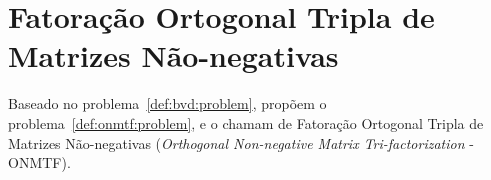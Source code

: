 \documentclass[
    12pt,                %
    oneside,            %
    a4paper,            %
    english,            %
    brazil                %
    ]{abntex2ppgsi}
\newtheorem{theorem}{Teorema}
\begin{document}




\section{Fatoração Ortogonal Tripla de Matrizes Não-negativas}
\label{sec:ONMTF}

Baseado no problema~\ref{def:bvd:problem},  propõem o problema~\ref{def:onmtf:problem}, e o chamam de Fatoração Ortogonal Tripla de Matrizes Não-negativas (\textit{Orthogonal Non-negative Matrix Tri-factorization} - ONMTF).
\end{document}
